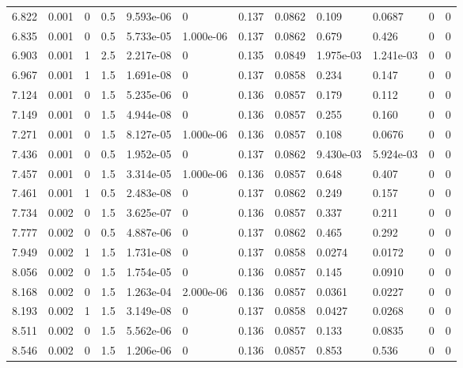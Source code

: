 \documentclass[preview]{standalone}
\begin{document}
{{{\begin{tabular}{L{1.2cm}C{1.2cm} C{0.3cm}C{0.5cm} C{1.4cm}C{1.4cm} C{1.4cm}C{1.4cm} C{1.6cm}C{1.6cm} C{1.6cm}C{1.6cm}}
  6.822  &  0.001  & 0     & 0.5 &  9.593e-06  & 0  &  0.137&   0.0862& 0.109 & 0.0687   &  0 & 0  \\ 
  6.835  &  0.001  & 0     & 0.5 &  5.733e-05  & 1.000e-06  &  0.137&   0.0862& 0.679 & 0.426   &  0 & 0  \\ 
  6.903  &  0.001  & 1     & 2.5 &  2.217e-08  & 0  &  0.135&   0.0849& 1.975e-03 & 1.241e-03   &  0 & 0  \\ 
  6.967  &  0.001  & 1     & 1.5 &  1.691e-08  & 0  &  0.137&   0.0858& 0.234 & 0.147   &  0 & 0  \\ 
  7.124  &  0.001  & 0     & 1.5 &  5.235e-06  & 0  &  0.136&   0.0857& 0.179 & 0.112   &  0 & 0  \\ 
  7.149  &  0.001  & 0     & 1.5 &  4.944e-08  & 0  &  0.136&   0.0857& 0.255 & 0.160   &  0 & 0  \\ 
  7.271  &  0.001  & 0     & 1.5 &  8.127e-05  & 1.000e-06  &  0.136&   0.0857& 0.108 & 0.0676   &  0 & 0  \\ 
  7.436  &  0.001  & 0     & 0.5 &  1.952e-05  & 0  &  0.137&   0.0862& 9.430e-03 & 5.924e-03   &  0 & 0  \\ 
  7.457  &  0.001  & 0     & 1.5 &  3.314e-05  & 1.000e-06  &  0.136&   0.0857& 0.648 & 0.407   &  0 & 0  \\ 
  7.461  &  0.001  & 1     & 0.5 &  2.483e-08  & 0  &  0.137&   0.0862& 0.249 & 0.157   &  0 & 0  \\ 
  7.734  &  0.002  & 0     & 1.5 &  3.625e-07  & 0  &  0.136&   0.0857& 0.337 & 0.211   &  0 & 0  \\ 
  7.777  &  0.002  & 0     & 0.5 &  4.887e-06  & 0  &  0.137&   0.0862& 0.465 & 0.292   &  0 & 0  \\ 
  7.949  &  0.002  & 1     & 1.5 &  1.731e-08  & 0  &  0.137&   0.0858& 0.0274 & 0.0172   &  0 & 0  \\ 
  8.056  &  0.002  & 0     & 1.5 &  1.754e-05  & 0  &  0.136&   0.0857& 0.145 & 0.0910   &  0 & 0  \\ 
  8.168  &  0.002  & 0     & 1.5 &  1.263e-04  & 2.000e-06  &  0.136&   0.0857& 0.0361 & 0.0227   &  0 & 0  \\ 
  8.193  &  0.002  & 1     & 1.5 &  3.149e-08  & 0  &  0.137&   0.0858& 0.0427 & 0.0268   &  0 & 0  \\ 
  8.511  &  0.002  & 0     & 1.5 &  5.562e-06  & 0  &  0.136&   0.0857& 0.133 & 0.0835   &  0 & 0  \\ 
  8.546  &  0.002  & 0     & 1.5 &  1.206e-06  & 0  &  0.136&   0.0857& 0.853 & 0.536   &  0 & 0  \\ 

\end{tabular}}}}
\end{document}
